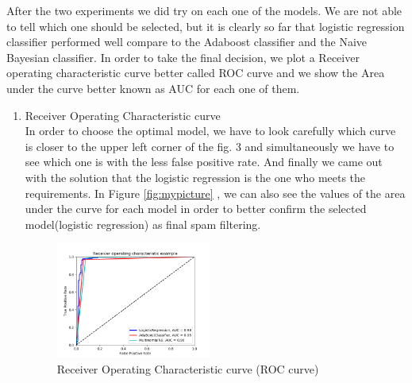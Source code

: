 \documentclass[journal]{IEEEtran}
\begin{document}
After the two experiments we did try on each one of the models. We are not able to tell which one should be selected, but it is clearly so far that logistic regression classifier performed well compare to the Adaboost classifier and the Naive Bayesian classifier. In order to take the final decision, we plot a Receiver operating characteristic curve better called ROC curve and we show the Area under the curve better known as AUC for each one of them.

\begin{enumerate}
\item Receiver Operating Characteristic curve\\
In order to choose the optimal model, we have to look carefully which curve is closer to the upper left corner of the fig. 3 and simultaneously we have to see which one is with the less false positive rate. And finally we came out with the solution that the logistic regression is the one who meets the requirements. In Figure \ref{fig:mypicture} , we can also see the values of the area under the curve for each model in order to better confirm the selected model(logistic regression) as final spam filtering.

\begin{figure}[!h]
\begin{center}
\includegraphics[width=2in]{roc.png}
\caption{Receiver Operating Characteristic curve (ROC curve)}
\end{center}
\end{figure}
\end{enumerate}
\end{document}

